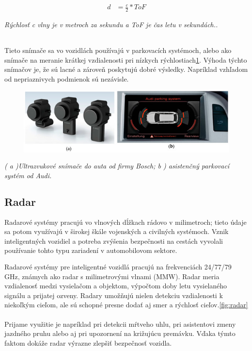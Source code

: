 \documentclass[10pt,oneside,slovak,a4paper]{article}
\begin{document}
\begin{equation} \label{eq1}
	\begin{split}
	d & = \frac{c}{2} * {ToF}
	\end{split}
	\end{equation}

\begin{center}
\centering
{
\emph{Rýchlosť c vlny je v metroch za sekundu a ToF je čas letu v sekundách.\cite{s19030648}.}
\\~\\
}
\end{center}


Tieto snímače sa vo vozidlách používajú v parkovacích systémoch, alebo ako snímače na meranie krátkej vzdialenosti pri nízkych rýchlostiach\ref{fig:ultrazvuk}. Výhoda týchto snímačov je, že sú lacné a zároveň poskytujú dobré výsledky. Napríklad vzhľadom od nepriaznivych podmienok sú nezávisle.

\begin{figure}[!h]
\centering
\includegraphics[scale=0.7]{senzory1.jpg}
\label{fig:ultrazvuk}
\end{figure}

\begin{center}
\centering
{
\emph{( a )Ultrazvukové snímače do auta od firmy Bosch; b ) asistenčný parkovací systém od Audi\cite{s19030648}.}
}
\end{center}

\newpage

\subsection{Radar}
Radarové systémy pracujú vo vlnových dĺžkach rádovo v milimetroch; tieto údaje sa potom využívajú v širokej škále vojenských a civilných systémoch. Vznik inteligentných vozidiel a potreba zvýšenia bezpečnosti na cestách vyvolali používanie tohto typu zariadení v automobilovom sektore. \par Radarové systémy pre inteligentné vozidlá pracujú na frekvenciách 24/77/79 GHz, známych ako radar s milimetrovými vlnami (MMW). Radar meria vzdialenosť medzi vysielačom a objektom, výpočtom doby letu vysielaného signálu a prijatej ozveny. Radary umožňujú nielen detekciu vzdialenosti k niekoľkým cieľom, ale sú schopné presne dodať aj smer a rýchlosť cieľov.\ref{fig:radar}
\\~\\
Prijame využitie je napríklad pri detekcii mŕtveho uhlu, pri asistentovi zmeny jazdného pruhu alebo aj pri upozornení na križujúcu premávku. Vďaka týmto faktom dokáže radar výrazne zlepšiť bezpečnosť vozidla.\cite{s19030648}
\end{document}
